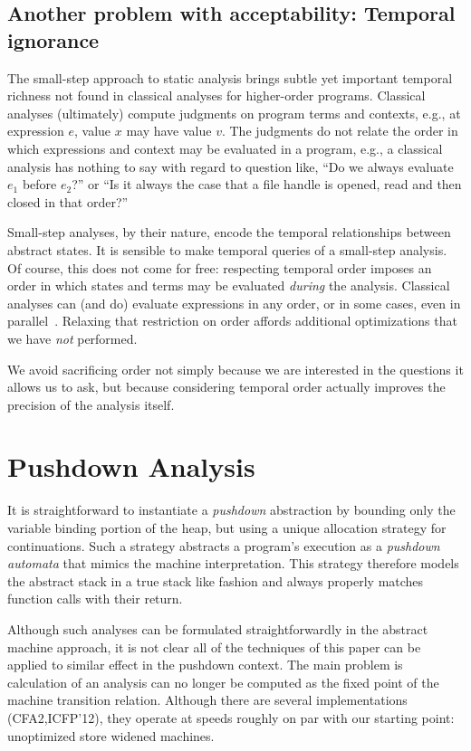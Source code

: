\documentclass[preprint]{sigplanconf}
\begin{document}
\subsection{Another problem with acceptability: Temporal ignorance}

The small-step approach to static analysis brings subtle yet important temporal
richness not found in classical analyses for higher-order programs.
%
Classical analyses (ultimately) compute judgments on program terms and
contexts, e.g., at expression $e$, value $x$ may have value $v$.
%
The judgments do not relate the order in which expressions and context may be
evaluated in a program, e.g., a classical analysis has nothing to say with
regard to question like, ``Do we always evaluate $e_1$ before $e_2$?'' or ``Is
it always the case that a file handle is opened, read and then closed in that
order?''

Small-step analyses, by their nature, encode the temporal relationships between
abstract states.
%
It is sensible to make temporal queries of a small-step analysis.
%
Of course, this does not come for free: respecting temporal order imposes an
order in which states and terms may be evaluated \emph{during} the analysis.
%
Classical analyses can (and do) evaluate expressions in any order, or in some
cases, even in parallel~\cite{might:Prabhu:2010:EigenCFA}.
%
Relaxing that restriction on order affords additional optimizations that we
have \emph{not} performed.

We avoid sacrificing order not simply because we are interested in the
questions it allows us to ask, but because considering temporal order actually
improves the precision of the analysis itself.



\section{Pushdown Analysis}

It is straightforward to instantiate a \emph{pushdown} abstraction by
bounding only the variable binding portion of the heap, but using a
unique allocation strategy for continuations.  Such a strategy
abstracts a program's execution as a \emph{pushdown automata}
that mimics the machine interpretation.  This strategy therefore
models the abstract stack in a true stack like fashion and always
properly matches function calls with their return.

Although such analyses can be formulated straightforwardly in the
abstract machine approach, it is not clear all of the techniques of
this paper can be applied to similar effect in the pushdown context.
The main problem is calculation of an analysis can no longer be
computed as the fixed point of the machine transition relation.
Although there are several implementations (CFA2,ICFP'12), they
operate at speeds roughly on par with our starting point: unoptimized
store widened
machines. \cite{dvanhorn:Earl2012Introspective,dvanhorn:Vardoulakis2011CFA2}
\end{document}
